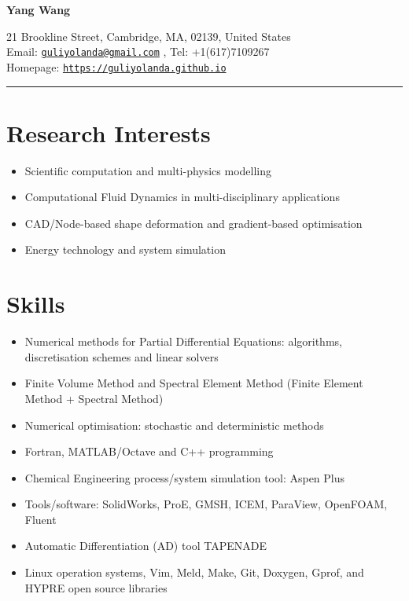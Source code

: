 \documentclass[letterpaper]{article}
\def\name{Yang Wang}
\begin{document}

\centerline{\LARGE \bf \name}


\begin{minipage}{\linewidth}
\begin{center}
21 Brookline Street, Cambridge, MA, 02139, United States\\
Email: \href{mailto:guliyolanda@gmail.com}{\tt guliyolanda@gmail.com} , Tel: +1(617)7109267 \\
Homepage:  \href{https://guliyolanda.github.io}{\tt https://guliyolanda.github.io} \\
\end{center}
\end{minipage}

\vspace{0pt}
\rule{\textwidth}{1pt}

\vspace{-12pt}
\section*{Research Interests}
\vspace{-10pt}
\begin{itemize}
\item Scientific computation and multi-physics modelling
\item Computational Fluid Dynamics in multi-disciplinary applications
\item CAD/Node-based shape deformation and gradient-based optimisation
\item Energy technology and system simulation
\end{itemize}

\vspace{-12pt}
\section*{Skills}
\vspace{-10pt}
\begin{itemize}
\item Numerical methods for Partial Differential Equations: algorithms, discretisation schemes and linear solvers
\item Finite Volume Method and Spectral Element Method (Finite Element Method + Spectral Method)
\item Numerical optimisation: stochastic and deterministic methods
\item Fortran, MATLAB/Octave and C++ programming
\item Chemical Engineering process/system simulation tool: Aspen Plus
\item Tools/software: SolidWorks, ProE, GMSH, ICEM, ParaView, OpenFOAM, Fluent
\item Automatic Differentiation (AD) tool TAPENADE
\item Linux operation systems, Vim, Meld, Make, Git, Doxygen, Gprof, and HYPRE open source libraries
\end{itemize}
\end{document}
